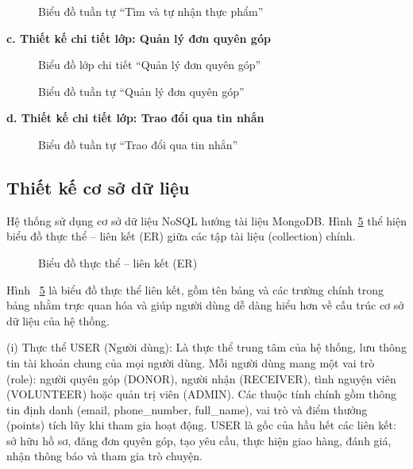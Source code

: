 \documentclass[../main.tex]{subfiles}%
\begin{document}
\begin{figure}[H]
    \centering
    \caption{Biểu đồ tuần tự ``Tìm và tự nhận thực phẩm''}
    \label{fig:seq_giao}
\end{figure}

\textbf{c. Thiết kế chi tiết lớp: Quản lý đơn quyên góp}

\begin{figure}[H]
    \centering
    \caption{Biểu đồ lớp chi tiết ``Quản lý đơn quyên góp''}
    \label{fig:cls_dang}
\end{figure}

\begin{figure}[H]
    \centering
    \caption{Biểu đồ tuần tự ``Quản lý đơn quyên góp''}
    \label{fig:seq_dang}
\end{figure}



\textbf{d. Thiết kế chi tiết lớp: Trao đổi qua tin nhắn}

\begin{figure}[H]
    \centering
    \captionsetup{skip=2pt}
    \caption{Biểu đồ tuần tự ``Trao đổi qua tin nhắn''}
    \label{fig:seq_chat}
\end{figure}

\subsection{Thiết kế cơ sở dữ liệu}
\label{subsection:4.2.3}

Hệ thống sử dụng cơ sở dữ liệu NoSQL hướng tài liệu MongoDB. Hình~\ref{fig:er} thể hiện biểu đồ thực thể -- liên kết (ER) giữa các tập tài liệu (collection) chính.

\begin{figure}[H]
    \centering
    \caption{Biểu đồ thực thể -- liên kết (ER)}
    \label{fig:er}
\end{figure}

Hình ~\ref{fig:er} là biểu đồ thực thể liên kết, gồm tên bảng và các trường chính trong bảng nhằm trực quan hóa và giúp người dùng dễ dàng hiểu hơn về cấu trúc cơ sở dữ liệu của hệ thống. 

(i) Thực thể USER (Người dùng): Là thực thể trung tâm của hệ thống, lưu thông tin tài khoản chung của mọi người dùng. Mỗi người dùng mang một vai trò (role): người quyên góp (DONOR), người nhận (RECEIVER), tình nguyện viên (VOLUNTEER) hoặc quản trị viên (ADMIN). Các thuộc tính chính gồm thông tin định danh (email, phone\_number, full\_name), vai trò và điểm thưởng (points) tích lũy khi tham gia hoạt động. USER là gốc của hầu hết các liên kết: sở hữu hồ sơ, đăng đơn quyên góp, tạo yêu cầu, thực hiện giao hàng, đánh giá, nhận thông báo và tham gia trò chuyện.
\end{document}
